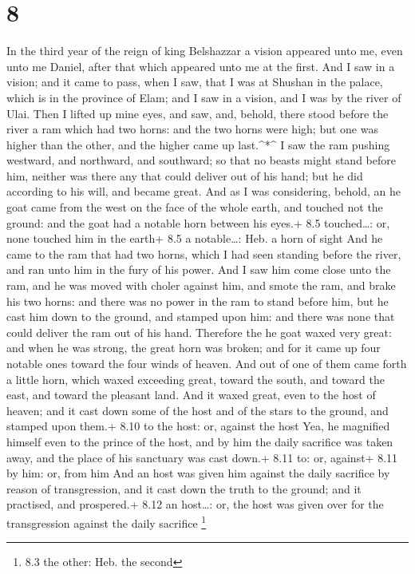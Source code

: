 \hypertarget{section-7}{%
\section{8}\label{section-7}}

 In the third year of the reign of king Belshazzar a vision
appeared unto me, even unto me Daniel, after that which appeared unto me
at the first.  And I saw in a vision; and it came to pass,
when I saw, that I was at Shushan in the palace, which is in the
province of Elam; and I saw in a vision, and I was by the river of Ulai.
 Then I lifted up mine eyes, and saw, and, behold, there
stood before the river a ram which had two horns: and the two horns were
high; but one was higher than the other, and the higher came up
last.\^{}*\^{}  I saw the ram pushing westward, and
northward, and southward; so that no beasts might stand before him,
neither was there any that could deliver out of his hand; but he did
according to his will, and became great.  And as I was
considering, behold, an he goat came from the west on the face of the
whole earth, and touched not the ground: and the goat had a notable horn
between his eyes.+ 8.5 touched\ldots: or, none touched him in the earth+
8.5 a notable\ldots: Heb. a horn of sight  And he came to
the ram that had two horns, which I had seen standing before the river,
and ran unto him in the fury of his power.  And I saw him
come close unto the ram, and he was moved with choler against him, and
smote the ram, and brake his two horns: and there was no power in the
ram to stand before him, but he cast him down to the ground, and stamped
upon him: and there was none that could deliver the ram out of his hand.
 Therefore the he goat waxed very great: and when he was
strong, the great horn was broken; and for it came up four notable ones
toward the four winds of heaven.  And out of one of them
came forth a little horn, which waxed exceeding great, toward the south,
and toward the east, and toward the pleasant land.  And it
waxed great, even to the host of heaven; and it cast down some of the
host and of the stars to the ground, and stamped upon them.+ 8.10 to the
host: or, against the host  Yea, he magnified himself even
to the prince of the host, and by him the daily sacrifice was taken
away, and the place of his sanctuary was cast down.+ 8.11 to: or,
against+ 8.11 by him: or, from him  And an host was given
him against the daily sacrifice by reason of transgression, and it cast
down the truth to the ground; and it practised, and prospered.+ 8.12 an
host\ldots: or, the host was given over for the transgression against
the daily sacrifice \footnote{8.3 the other: Heb. the second}

